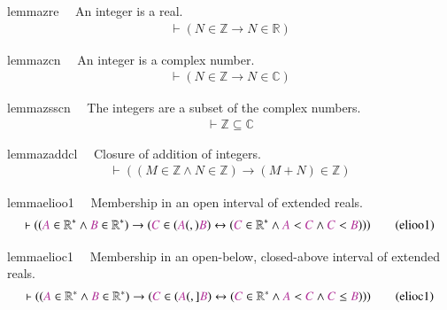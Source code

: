\dfq

\begin{restatable}{lemma}{zre}~~ An integer is a real.  ~
\begin{align}
\vdash ( N \in \mathbb{Z} \rightarrow N \in \mathbb{R} )\label{eq:zre}\tag{zre}
\end{align}
\end{restatable}

\begin{restatable}{lemma}{zcn}~~ An integer is a complex number.  
\begin{align}
\vdash ( N \in \mathbb{Z} \rightarrow N \in \mathbb{C} )\label{eq:zcn}\tag{zcn}
\end{align}
\end{restatable}

\begin{restatable}{lemma}{zsscn}~~ The integers are a subset of the complex
numbers.  ~
\begin{align}
\vdash \mathbb{Z} \subseteq \mathbb{C}\label{eq:zsscn}\tag{zsscn}
\end{align}
\end{restatable}

\begin{restatable}{lemma}{zaddcl}~~ Closure of addition of integers. 
\begin{align}
\vdash ( ( M \in \mathbb{Z} \wedge N \in \mathbb{Z} ) \rightarrow ( M + N ) \in
    \mathbb{Z} )\label{eq:zaddcl}\tag{zaddcl}
\end{align}
\end{restatable}


\begin{restatable}{lemma}{elioo1}~~ Membership in an open interval of extended
reals.  ~  ~
\begin{align}
\vdash ( ( \mc{A} \in \mathbb{R}^{\ast} \wedge \mc{B} \in \mathbb{R}^{\ast} )
    \rightarrow ( \mc{C} \in ( \mc{A} (,) \mc{B} ) \leftrightarrow ( \mc{C} \in
    \mathbb{R}^{\ast} \wedge \mc{A} < \mc{C} \wedge \mc{C} < \mc{B} ) )
    )\label{eq:elioo1}\tag{elioo1}
\end{align}
\end{restatable}

\begin{restatable}{lemma}{elioc1}~~ Membership in an open-below, closed-above
interval of extended reals.
       ~  ~
\begin{align}
\vdash ( ( \mc{A} \in \mathbb{R}^{\ast} \wedge \mc{B} \in \mathbb{R}^{\ast} )
    \rightarrow ( \mc{C} \in ( \mc{A} (,] \mc{B} ) \leftrightarrow ( \mc{C} \in
    \mathbb{R}^{\ast} \wedge \mc{A} < \mc{C} \wedge \mc{C} \le \mc{B} ) )
    )\label{eq:elioc1}\tag{elioc1}
\end{align}
\end{restatable}

